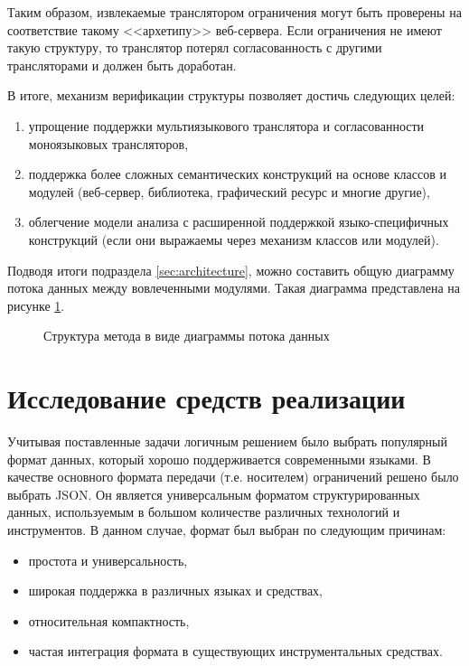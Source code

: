 Таким образом, извлекаемые транслятором ограничения могут быть проверены на соответствие такому <<архетипу>> веб-сервера.
Если ограничения не имеют такую структуру, то транслятор потерял согласованность с другими трансляторами и должен быть доработан.

В итоге, механизм верификации структуры позволяет достичь следующих целей:
\begin{enumerate}[1)]
    \item упрощение поддержки мультиязыкового транслятора и согласованности моноязыковых трансляторов,
    \item поддержка более сложных семантических конструкций на основе классов и модулей (веб-сервер, библиотека, графический ресурс и многие другие),
    \item облегчение модели анализа с расширенной поддержкой языко-специфичных конструкций (если они выражаемы через механизм классов или модулей).
\end{enumerate}

Подводя итоги подраздела \ref{sec:architecture}, можно составить общую диаграмму потока данных между вовлеченными модулями. Такая
диаграмма представлена на рисунке \ref{fig:framework}.

\begin{figure}[H]
    \centering
    \caption{Структура метода в виде диаграммы потока данных}
    \label{fig:framework}
\end{figure}

\section{Исследование средств реализации}

Учитывая поставленные задачи
логичным решением было выбрать популярный формат данных, который хорошо поддерживается современными
языками. В качестве основного формата передачи (т.е. носителем) ограничений решено было выбрать JSON.
Он является универсальным форматом структурированных данных, используемым в большом количестве
различных технологий и инструментов. В данном случае, формат был выбран по следующим причинам:
\begin{itemize}
    \item простота и универсальность,
    \item широкая поддержка в различных языках и средствах,
    \item относительная компактность,
    \item частая интеграция формата в существующих инструментальных средствах.
\end{itemize}

